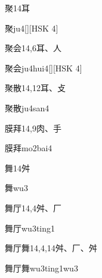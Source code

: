 \begin{entry}{聚}{14}{⽿}
  \begin{phonetics}{聚}{ju4}[][HSK 4]
  \end{phonetics}
\end{entry}

\begin{entry}{聚会}{14,6}{⽿、⼈}
  \begin{phonetics}{聚会}{ju4hui4}[][HSK 4]
  \end{phonetics}
\end{entry}

\begin{entry}{聚散}{14,12}{⽿、⽁}
  \begin{phonetics}{聚散}{ju4san4}
  \end{phonetics}
\end{entry}

\begin{entry}{膜拜}{14,9}{⾁、⼿}
  \begin{phonetics}{膜拜}{mo2bai4}
  \end{phonetics}
\end{entry}

\begin{entry}{舞}{14}{⾇}
  \begin{phonetics}{舞}{wu3}
  \end{phonetics}
\end{entry}

\begin{entry}{舞厅}{14,4}{⾇、⼚}
  \begin{phonetics}{舞厅}{wu3ting1}
  \end{phonetics}
\end{entry}

\begin{entry}{舞厅舞}{14,4,14}{⾇、⼚、⾇}
  \begin{phonetics}{舞厅舞}{wu3ting1wu3}
  \end{phonetics}
\end{entry}

